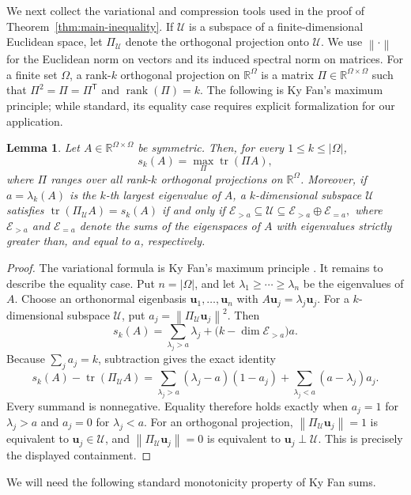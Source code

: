 \documentclass[11pt]{article}
\newtheorem{lemma}[theorem]{Lemma}
\newcommand{\R}{\mathbb{R}}
\newcommand{\tr}{\operatorname{tr}}
\newcommand{\rank}{\operatorname{rank}}
\newcommand{\norm}[1]{\left\lVert #1\right\rVert}
\newcommand{\scrU}{\mathscr{U}}
\newcommand{\scrE}{\mathscr{E}}
\begin{document}
We next collect the variational and compression tools used in the proof
of Theorem~\ref{thm:main-inequality}.   If \(\scrU\) is a subspace
	of a finite-dimensional Euclidean space, let \(\Pi_{\scrU}\) denote the
	orthogonal projection onto \(\scrU\).  We use \(\norm{\cdot}\) for the
	Euclidean norm on vectors and its induced spectral norm on matrices.  For a
	finite set \(\Omega\), a rank-\(k\)
	orthogonal projection on \(\R^\Omega\) is a matrix \(\Pi\in\R^{\Omega\times\Omega}\)
	such that \(\Pi^2=\Pi=\Pi^{\mathsf T}\) and \(\rank(\Pi)=k\).
The following is Ky Fan's maximum principle; while standard,
its equality case requires explicit formalization for our application.
	\begin{lemma}\label{lem:kyfan}
		Let \(A\in\R^{\Omega\times\Omega}\) be symmetric.
		Then, for every \(1\le k\le |\Omega|\),
		\[
		s_k(A)
		=
		\max_\Pi \tr(\Pi A),
		\]
		where \(\Pi\) ranges over all rank-\(k\) orthogonal projections on \(\R^\Omega\).
		Moreover, if \(a=\lambda_k(A)\) is the \(k\)-th largest eigenvalue of \(A\), a \(k\)-dimensional subspace \(\scrU\)  satisfies \(\tr(\Pi_{\scrU}A)=s_k(A)\) if and only if $\scrE_{>a}\subseteq\scrU\subseteq\scrE_{>a}\oplus\scrE_{=a},$
		where \(\scrE_{>a}\) and \(\scrE_{=a}\) denote the sums of the eigenspaces
		of \(A\) with eigenvalues strictly greater than, and equal to \(a\),
		respectively.
	\end{lemma}
	
	\begin{proof}
		The variational formula is Ky Fan's maximum principle \cite[Theorem~1]{Fan}.
		It remains to describe the equality case.
		Put \(n=|\Omega|\), and let \(\lambda_1\ge\cdots\ge\lambda_n\) be the eigenvalues of \(A\).
		Choose an orthonormal eigenbasis \(\mathbf u_1,\ldots,\mathbf u_n\)
		with \(A\mathbf u_j=\lambda_j\mathbf u_j\). For a \(k\)-dimensional subspace
		\(\scrU\), put \(a_j=\norm{\Pi_{\scrU}\mathbf u_j}^2\). Then
		\[
		s_k(A)=\sum_{\lambda_j>a}\lambda_j+ \bigl(k-\dim\scrE_{>a}\bigr)a.
		\]
		Because \(\sum_j a_j=k\), subtraction gives the exact identity
		\[
		s_k(A)-\tr(\Pi_{\scrU}A)
		=\sum_{\lambda_j>a}(\lambda_j-a)(1-a_j)
		+\sum_{\lambda_j<a}(a-\lambda_j)a_j.
		\]
		Every summand is nonnegative. Equality therefore holds exactly when
		\(a_j=1\) for \(\lambda_j>a\) and \(a_j=0\) for \(\lambda_j<a\).
		For an orthogonal projection, \(\norm{\Pi_{\scrU}\mathbf u_j}=1\) is equivalent to
		\(\mathbf u_j\in\scrU\), and \(\norm{\Pi_{\scrU}\mathbf u_j}=0\) is equivalent to
		\(\mathbf u_j\perp\scrU\). This is precisely the displayed containment.
	\end{proof}
We will need the following standard monotonicity property of Ky Fan sums.
	
\end{document}
